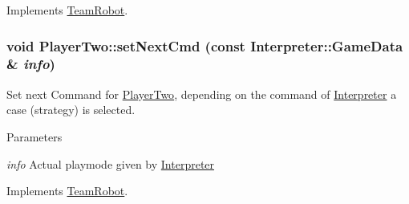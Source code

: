 Implements \hyperlink{classTeamRobot_a34c0fd6986c510d4025e5752b3c0e49a}{TeamRobot}.

\hypertarget{classPlayerTwo_a7ac9a9a4f1dedee2006e6a0c79f37c0c}{
\subsubsection[{setNextCmd}]{\setlength{\rightskip}{0pt plus 5cm}void PlayerTwo::setNextCmd (const {\bf Interpreter::GameData} \& {\em info})}}
\label{classPlayerTwo_a7ac9a9a4f1dedee2006e6a0c79f37c0c}


Set next Command for \hyperlink{classPlayerTwo}{PlayerTwo}, depending on the command of \hyperlink{classInterpreter}{Interpreter} a case (strategy) is selected. 


\begin{DoxyParams}{Parameters}
\item[{\em info}]Actual playmode given by \hyperlink{classInterpreter}{Interpreter} \end{DoxyParams}


Implements \hyperlink{classTeamRobot_a65f9a2b7464dfac3f4a0336810cf574f}{TeamRobot}.




